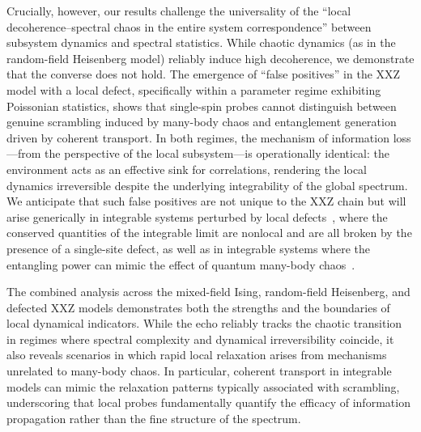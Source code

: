 \documentclass[pra,twocolumn,aps,showpacs,superscriptaddress,longbibliography]{revtex4-2}
\begin{document}
Crucially, however, our results challenge the universality of the ``local decoherence--spectral chaos in the entire system correspondence'' between subsystem dynamics and spectral statistics. While chaotic dynamics (as in the random-field Heisenberg model) reliably induce high decoherence, we demonstrate that the converse does not hold. The emergence of ``false positives'' in the XXZ model with a local defect, specifically within a parameter regime exhibiting Poissonian statistics, shows that single-spin probes cannot distinguish between genuine scrambling induced by many-body chaos and entanglement generation driven by coherent transport. In both regimes, the mechanism of information loss---from the perspective of the local subsystem---is operationally identical: the environment acts as an effective sink for correlations, rendering the local dynamics irreversible despite the underlying integrability of the global spectrum. We anticipate that such false positives are not unique to the XXZ chain but will arise generically in integrable systems perturbed by local defects~\cite{santos_2020_speck}, where the conserved quantities of the integrable limit are nonlocal and are all broken by the presence of a single-site defect, as well as in integrable systems where the entangling power can mimic the effect of quantum many-body chaos~\cite{betheanzatsmagic2025}.

The combined analysis across the mixed-field Ising, random-field Heisenberg, and defected XXZ models demonstrates both the strengths and the boundaries of local dynamical indicators. While the echo reliably tracks the chaotic transition in regimes where spectral complexity and dynamical irreversibility coincide, it also reveals scenarios in which rapid local relaxation arises from mechanisms unrelated to many-body chaos. In particular, coherent transport in integrable models can mimic the relaxation patterns typically associated with scrambling, underscoring that local probes fundamentally quantify the efficacy of information propagation rather than the fine structure of the spectrum.
%

\end{document}

